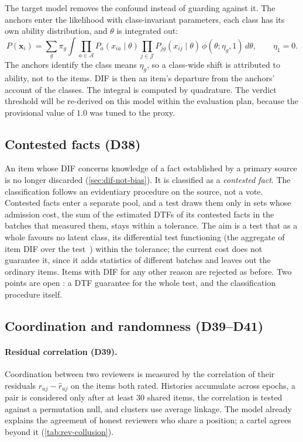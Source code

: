 The target model removes the confound instead of guarding against it. The anchors enter the
likelihood with class-invariant parameters, each class has its own ability distribution, and
$\theta$ is integrated out:
\begin{equation}\label{eq:full-mixture}
  P(\mathbf x_i)=\sum_g\pi_g\int\prod_{a\in\mathcal A}P_a(x_{ia}\mid\theta)
  \prod_{j\in\mathcal J}P_{jg}(x_{ij}\mid\theta)\,\phi(\theta;\eta_g,1)\,d\theta,
  \qquad \eta_1=0.
\end{equation}
The anchors identify the class means $\eta_g$, so a class-wide shift is attributed to ability,
not to the items. DIF is then an item's departure from the anchors' account of the classes. The
integral is computed by quadrature. The verdict threshold will be re-derived on this model within
the evaluation plan, because the provisional value of $1.0$ was tuned to the proxy.

\subsection{Contested facts (D38)}

An item whose DIF concerns knowledge of a fact established by a primary source is no longer
discarded (\cref{sec:dif-not-bias}). It is classified as a \emph{contested fact}. The
classification follows an evidentiary procedure on the source, not a vote. Contested facts enter a
separate pool, and a test draws them only in sets whose admission cost, the sum of the estimated
DTFs of its contested facts in the batches that measured them, stays within a tolerance. The aim is
a test that as a whole favours no latent class, its differential test functioning (the aggregate of
item DIF over the test~\cite{shealy1993sibtest}) within the tolerance; the current cost does not
guarantee it, since it adds statistics of different batches and leaves out the ordinary items.
Items with DIF for any other reason are rejected as before. Two points are open \openq: a DTF
guarantee for the whole test, and the classification procedure itself.

\subsection{Coordination and randomness (D39--D41)}

\paragraph{Residual correlation (D39).} Coordination between two reviewers is measured by the
correlation of their residuals $r_{uj}-\hat r_{uj}$ on the items both rated. Histories accumulate
across epochs, a pair is considered only after at least 30 shared items, the correlation is tested
against a permutation null, and clusters use average linkage. The model already explains the
agreement of honest reviewers who share a position; a cartel agrees beyond it
(\cref{tab:rev-collusion}).

